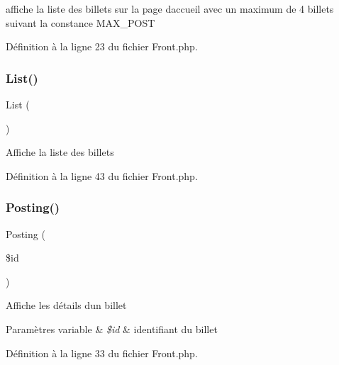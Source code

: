 affiche la liste des billets sur la page d\textquotesingle{}accueil avec un maximum de 4 billets suivant la constance M\+A\+X\+\_\+\+P\+O\+ST 

Définition à la ligne 23 du fichier Front.\+php.

\mbox{\label{class_src_1_1_controllers_1_1_front_a17e6c90f14225bdac5c65ed915b0a2f6}} 
\subsubsection{\texorpdfstring{List()}{List()}}
{\footnotesize\ttfamily List (\begin{DoxyParamCaption}{ }\end{DoxyParamCaption})}

Affiche la liste des billets 

Définition à la ligne 43 du fichier Front.\+php.

\mbox{\label{class_src_1_1_controllers_1_1_front_a5fcbe325afb03acc6e4eaec38a7bb1ae}} 
\subsubsection{\texorpdfstring{Posting()}{Posting()}}
{\footnotesize\ttfamily Posting (\begin{DoxyParamCaption}\item[{}]{\$id }\end{DoxyParamCaption})}

Affiche les détails d\textquotesingle{}un billet 
\begin{DoxyParams}[1]{Paramètres}
variable & {\em \$id} & identifiant du billet \\
\hline
\end{DoxyParams}


Définition à la ligne 33 du fichier Front.\+php.

\mbox{\label{class_src_1_1_controllers_1_1_front_a8b22c40bd1737bbb7db0816b7e9763b3}} 
